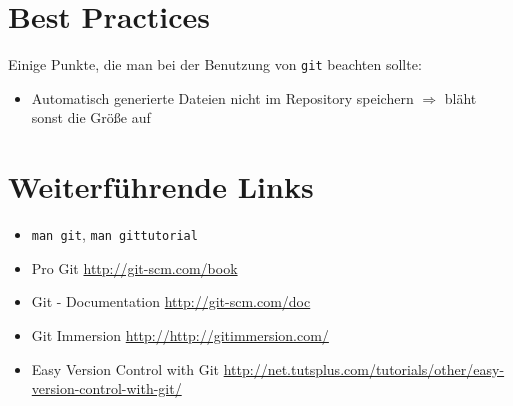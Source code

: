 \section{Best Practices}

Einige Punkte, die man bei der Benutzung von \texttt{git} beachten sollte:
\begin{itemize}
  \item Automatisch generierte Dateien nicht im Repository speichern $\Rightarrow$ bläht sonst die Größe auf
\end{itemize}

\section{Weiterführende Links}
\begin{itemize}
  \item \texttt{man git}, \texttt{man gittutorial}
  \item Pro Git \url{http://git-scm.com/book}
  \item Git - Documentation \url{http://git-scm.com/doc}
  \item Git Immersion \url{http://http://gitimmersion.com/}
  \item Easy Version Control with Git \url{http://net.tutsplus.com/tutorials/other/easy-version-control-with-git/}
\end{itemize}
